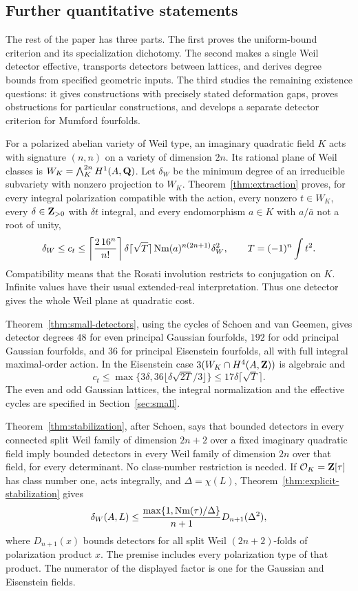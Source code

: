 \subsection{Further quantitative statements}

The rest of the paper has three parts.  The first proves the uniform-bound
criterion and its specialization dichotomy.  The second makes a single
Weil detector effective, transports detectors between lattices, and derives
degree bounds from specified geometric inputs.  The third studies the
remaining existence questions: it gives constructions with precisely stated
deformation gaps, proves obstructions for particular constructions, and
develops a separate detector criterion for Mumford fourfolds.

For a polarized abelian variety of Weil type, an imaginary quadratic field $K$ acts with signature $(n,n)$ on a variety of dimension $2n$. Its rational plane of Weil classes is
$W_K=\bigwedge_K^{2n}H^1(A,\mathbf Q)$. Let $\delta_W$ be the minimum degree of an irreducible subvariety with nonzero projection to $W_K$. Theorem~\ref{thm:extraction} proves, for every integral polarization compatible with the action, every nonzero $t\in W_K$, every $\delta\in\mathbf Z_{>0}$ with $\delta t$ integral, and every endomorphism $a\in K$ with $a/\bar a$ not a root of unity,
\[
 \delta_W\leq c_t\leq
 \left\lceil\frac{2\,16^n}{n!}\right\rceil
 \delta\lceil\sqrt T\rceil\operatorname{Nm}(a)^{n(2n+1)}\delta_W^2,
 \qquad T=(-1)^n\int t^2.
\]
Compatibility means that the Rosati involution restricts to conjugation on $K$. Infinite values have their usual extended-real interpretation. Thus one detector gives the whole Weil plane at quadratic cost.

Theorem~\ref{thm:small-detectors}, using the cycles of Schoen and van Geemen, gives detector degrees $48$ for even principal Gaussian fourfolds, $192$ for odd principal Gaussian fourfolds, and $36$ for principal Eisenstein fourfolds, all with full integral maximal-order action. In the Eisenstein case $3(W_K\cap H^4(A,\mathbf Z))$ is algebraic and
\[
 c_t\leq\max\{3\delta,36\lfloor\delta\sqrt{2T}/3\rfloor\}
 \leq17\delta\lceil\sqrt T\rceil.
\]
The even and odd Gaussian lattices, the integral normalization and the effective cycles are specified in Section~\ref{sec:small}.

Theorem~\ref{thm:stabilization}, after Schoen, says that bounded detectors in every connected split Weil family of dimension $2n+2$ over a fixed imaginary quadratic field imply bounded detectors in every Weil family of dimension $2n$ over that field, for every determinant. No class-number restriction is needed. If $\mathcal O_K=\mathbf Z[\tau]$ has class number one, acts integrally, and $\Delta=\chi(L)$, Theorem~\ref{thm:explicit-stabilization} gives
\[
 \delta_W(A,L)\leq\frac{\max\{1,\operatorname{Nm}(\tau)/\Delta\}}{n+1}D_{n+1}(\Delta^2),
\]
where $D_{n+1}(x)$ bounds detectors for all split Weil $(2n+2)$-folds of polarization product $x$. The premise includes every polarization type of that product. The numerator of the displayed factor is one for the Gaussian and Eisenstein fields.

